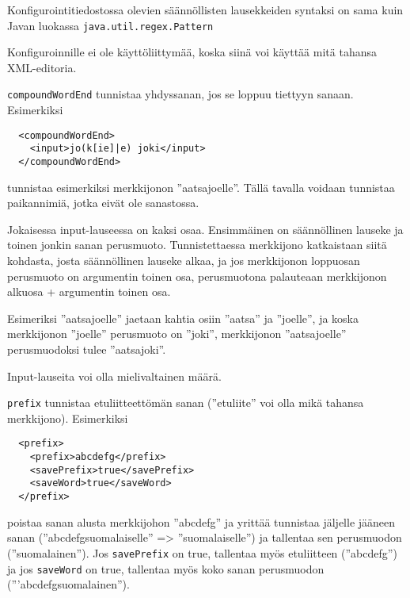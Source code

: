 \documentclass[12pt]{article}
\begin{document}
Konfigurointitiedostossa olevien säännöllisten lausekkeiden syntaksi on
sama kuin Javan luokassa \verb=java.util.regex.Pattern=

Konfiguroinnille ei ole käyttöliittymää, koska siinä voi käyttää mitä
tahansa XML-editoria.




\bigskip
\verb|compoundWordEnd| tunnistaa yhdyssanan, jos se loppuu tiettyyn sanaan.
Esimerkiksi

\begin{verbatim}
  <compoundWordEnd>
    <input>jo(k[ie]|e) joki</input>
  </compoundWordEnd>
\end{verbatim}

tunnistaa esimerkiksi merkkijonon ''aatsajoelle''. Tällä tavalla
voidaan tunnistaa paikannimiä, jotka eivät ole sanastossa.

Jokaisessa input-lauseessa on kaksi osaa. Ensimmäinen on säännöllinen
lauseke ja toinen jonkin sanan perusmuoto. Tunnistettaessa merkkijono
katkaistaan siitä kohdasta, josta säännöllinen lauseke alkaa, ja jos
merkkijonon loppuosan perusmuoto on argumentin toinen osa,
perusmuotona palauteaan merkkijonon alkuosa + argumentin toinen osa.

Esimeriksi ''aatsajoelle'' jaetaan kahtia osiin ''aatsa'' ja
''joelle'', ja koska merkkijonon ''joelle'' perusmuoto on ''joki'',
merkkijonon ''aatsajoelle'' perusmuodoksi tulee ''aatsajoki''.

Input-lauseita voi olla mielivaltainen määrä.




\bigskip
\verb|prefix| tunnistaa etuliitteettömän sanan (''etuliite'' voi olla
mikä tahansa merkkijono). Esimerkiksi

\begin{verbatim}
  <prefix>
    <prefix>abcdefg</prefix>
    <savePrefix>true</savePrefix>
    <saveWord>true</saveWord>
  </prefix>
\end{verbatim}

poistaa sanan alusta merkkijohon ''abcdefg'' ja yrittää tunnistaa
jäljelle jääneen sanan (''abcdefgsuomalaiselle'' => ''suomalaiselle'')
ja tallentaa sen perusmuodon (''suomalainen''). Jos \verb|savePrefix|
on true, tallentaa myös etuliitteen (''abcdefg'') ja jos
\verb|saveWord| on true, tallentaa myös koko sanan perusmuodon
('''abcdefgsuomalainen'').


\end{document}
